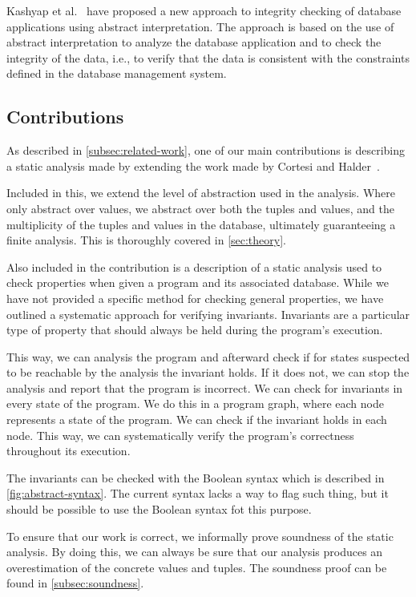 Kashyap et al.~\cite{kashyap_integrity_2022} have proposed a new approach to integrity checking of database applications using abstract interpretation.
The approach is based on the use of abstract interpretation to analyze the database application and to check the integrity of the data, i.e., to verify that the data is consistent with the constraints defined in the database management system.


\subsection{Contributions}\label{subsec:contributions}
As described in \autoref{subsec:related-work}, one of our main contributions is describing a static analysis made by extending the work made by Cortesi and Halder~\cite{halder_abstract_2012}.

Included in this, we extend the level of abstraction used in the analysis.
Where~\cite{halder_abstract_2012} only abstract over values, we abstract over both the tuples and values, and the multiplicity of the tuples and values in the database, ultimately guaranteeing a finite analysis.
This is thoroughly covered in \autoref{sec:theory}.

Also included in the contribution is a description of a static analysis used to check properties when given a program and its associated database.
While we have not provided a specific method for checking general properties, we have outlined a systematic approach for verifying invariants.
Invariants are a particular type of property that should always be held during the program's execution.

This way, we can analysis the program and afterward check if for states suspected to be reachable by the analysis the invariant holds.
If it does not, we can stop the analysis and report that the program is incorrect.
We can check for invariants in every state of the program.
We do this in a program graph, where each node represents a state of the program.
We can check if the invariant holds in each node.
This way, we can systematically verify the program's correctness throughout its execution.

The invariants can be checked with the Boolean syntax which is described in \autoref{fig:abstract-syntax}.
The current syntax lacks a way to flag such thing, but it should be possible to use the Boolean syntax fot this purpose.

To ensure that our work is correct, we informally prove soundness of the static analysis.
By doing this, we can always be sure that our analysis produces an overestimation of the concrete values and tuples.
The soundness proof can be found in \autoref{subsec:soundness}.

